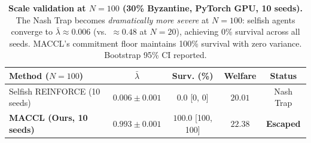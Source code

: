 \begin{table}[h]
\centering
\caption{%
  \textbf{Scale validation at $N{=}100$ (30\% Byzantine, PyTorch GPU, 10 seeds).}
  The Nash Trap becomes \emph{dramatically more severe} at $N{=}100$:
  selfish agents converge to $\bar\lambda \approx 0.006$
  (vs.\ $\approx 0.48$ at $N{=}20$), achieving 0\% survival across all seeds.
  MACCL's commitment floor maintains 100\% survival with zero variance.
  Bootstrap 95\% CI reported.
}
\label{tab:scale_n100_deep}
\small
\begin{tabular}{@{}lcccc@{}}
\toprule
\textbf{Method ($N{=}100$)} & $\bar\lambda$ & \textbf{Surv. (\%)} & \textbf{Welfare} & \textbf{Status} \\
\midrule
Selfish REINFORCE (10 seeds) & $0.006 \pm 0.001$ & $0.0$ \tiny{[0, 0]} & $20.01$ & Nash Trap \\
\midrule
\textbf{MACCL (Ours, 10 seeds)} & $\mathbf{0.993} \pm 0.001$ & $\mathbf{100.0}$ \tiny{[100, 100]} & $\mathbf{22.38}$ & \textbf{Escaped} \\
\bottomrule
\end{tabular}
\end{table}
